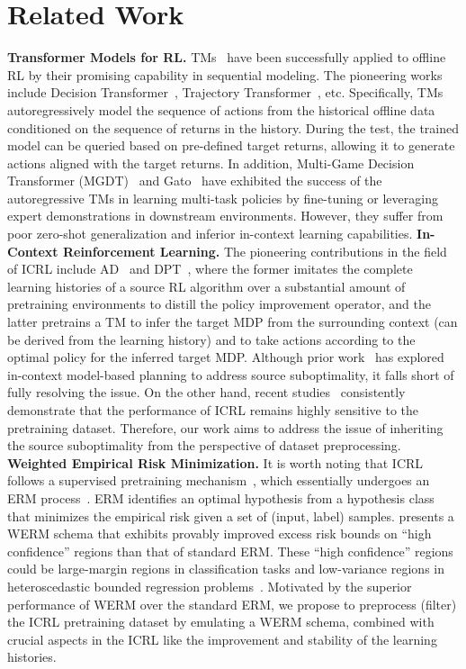 \documentclass{article}
\begin{document}
\section{Related Work}
\label{section_related_work}
\textbf{Transformer Models for RL.}
TMs~\citep{vaswani2017attention} have been successfully applied to offline RL by their promising capability in sequential modeling. The pioneering works include Decision Transformer~\cite{chen2021decision}, Trajectory Transformer~\cite{janner2021offline}, etc. Specifically, TMs autoregressively model the sequence of actions from the historical offline data conditioned on the sequence of returns in the history.
During the test, the trained model can be queried based on pre-defined target returns, allowing it to generate actions aligned with the target returns.
In addition, Multi-Game Decision Transformer (MGDT)~\citep{lee2022multi} and Gato~\citep{reed2022generalist} have exhibited the success of the autoregressive TMs in learning multi-task policies by fine-tuning or leveraging expert demonstrations in downstream environments. However, they suffer from poor zero-shot generalization and inferior in-context learning capabilities.
\textbf{In-Context Reinforcement Learning.}
The pioneering contributions in the field of ICRL include AD~\cite{laskin2022context} and DPT~\cite{lee2024supervised}, where the former imitates the complete learning histories of a source RL algorithm over a substantial amount of pretraining environments to distill the policy improvement operator, and the latter pretrains a TM to infer the target MDP from the surrounding context (can be derived from the learning history) and to take actions according to the optimal policy for the inferred target MDP.
Although prior work~\cite{son2025distilling} has explored in-context model-based planning to address source suboptimality, it falls short of fully resolving the issue. On the other hand, recent studies~\cite{zisman2024emergence, dong2024context, chen2025random} consistently demonstrate that the performance of ICRL remains highly sensitive to the pretraining dataset.
Therefore, our work aims to address the issue of inheriting the source suboptimality from the perspective of dataset preprocessing.
\textbf{Weighted Empirical Risk Minimization.}
It is worth noting that ICRL follows a supervised pretraining mechanism~\cite{chen2025random}, which essentially undergoes an ERM process~\cite{bartlett2005local, massart2006risk}.
ERM identifies an optimal hypothesis from a hypothesis class that minimizes the empirical risk given a set of (input, label) samples. \cite{zhang2025reweighting} presents a WERM schema that exhibits provably improved excess risk bounds on ``high confidence'' regions than that of standard ERM. These ``high confidence'' regions could be large-margin regions in classification tasks and low-variance regions in heteroscedastic bounded regression problems~\cite{zhang2025reweighting}. Motivated by the superior performance of WERM over the standard ERM, we propose to preprocess (filter) the ICRL pretraining dataset by emulating a WERM schema, combined with crucial aspects in the ICRL like the improvement and stability of the learning histories.
\end{document}
